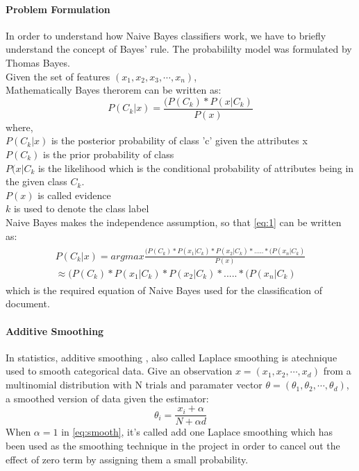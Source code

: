 \paragraph{Problem Formulation}\hfill 

In order to understand how Naive Bayes classifiers \cite{naive} work, we have to briefly understand the concept of Bayes' rule. The probabililty model was formulated by Thomas Bayes.\\
Given the set of features $(x_1,x_2,x_3,\cdots, x_n)$, \\
Mathematically Bayes therorem can be written as:
\begin{equation}\label{eq:1}
P(C_{k}|x) = \frac{(P(C_{k}) * P(x|C_{k})} { P(x)}
\end{equation}
where,\\
$P(C_{k} |x)$ is the posterior probability of class 'c' given the attributes x \\
$P(C_{k})$ is the prior probability of class \\
$P(x|C_{k}$ is the likelihood which is the conditional probability of attributes being in the given class $C_k$.\\
$P(x)$ is called evidence \\
$k$ is used to denote the class label \\
Naive Bayes makes the independence assumption, so that \ref{eq:1} can be written as:
\begin{align}
\begin{split}\label{eq:naive}
P(C_{k}|x) = argmax \frac{(P(C_{k}) * P(x_1|C_{k}) * P(x_2|C_{k})*.....* (P(x_n|C_{k})} { P(x)} \\
\approx  (P(C_{k}) * P(x_1|C_{k}) * P(x_2|C_{k})*.....* (P(x_n|C_{k})
\end{split}
\end{align}
which is the required equation of Naive Bayes used for the classification of document.

\paragraph{Additive Smoothing}\hfill

In statistics, additive smoothing \cite{additive}, also called Laplace smoothing is atechnique used to smooth categorical data. Give an observation $x = (x_1,x_2,\cdots,x_d)$ from a multinomial distribution with N trials and paramater vector $\theta = (\theta_1,\theta_2,\cdots,\theta_d)$, a smoothed version of data given the estimator:
\begin{equation}\label{eq:smooth}
	\theta_i = \frac{x_i + \alpha}{N+ \alpha d}
\end{equation}
When $\alpha = 1 $ in \ref{eq:smooth}, it's called add one Laplace smoothing which has been used as the smoothing technique in the project in order to cancel out the effect of zero term by assigning them a small probability.

